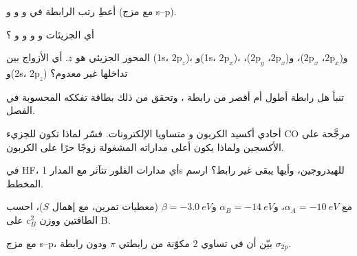 \begin{exercise}[$\star$]\label{exo:b2:diatomic-mos:2}
أعطِ رتب الرابطة في  و و و (مع مزج
s--p).
\end{exercise}

\begin{exercise}[$\star$]\label{exo:b2:diatomic-mos:3}
أي الجزيئات  و و و و ؟
\end{exercise}

\begin{exercise}[$\star$]\label{exo:b2:diatomic-mos:4}
المحور الجزيئي هو $z$. أي الأزواج بين (1s، $2\mathrm p_z$)، و(1s،
$2\mathrm p_x$)، و($2\mathrm p_x$، $2\mathrm p_x$)، و($2\mathrm p_x$، $2\mathrm p_y$)،
و(2s، $2\mathrm p_z$) تداخلها غير معدوم؟
\end{exercise}

\begin{exercise}[$\star\star$]\label{exo:b2:diatomic-mos:5}
تنبأ هل رابطة  أطول أم أقصر من رابطة ، وتحقق من ذلك بطاقة
تفككه المحسوبة في الفصل.
\end{exercise}

\begin{exercise}[$\star\star$]\label{exo:b2:diatomic-mos:6}
أحادي أكسيد الكربون و متساويا الإلكترونات. فسّر لماذا تكون 
للجزيء CO مرجَّحة على الأكسجين ولماذا يكون أعلى مداراته المشغولة زوجًا حرًا على
الكربون.
\end{exercise}

\begin{exercise}[$\star\star$]\label{exo:b2:diatomic-mos:7}
في HF، أي مدارات الفلور تتآثر مع المدار 1s للهيدروجين، وأيها يبقى
غير رابط؟ ارسم المخطط.
\end{exercise}

\begin{exercise}[$\star\star$]\label{exo:b2:diatomic-mos:8}
مع $\alpha_A = \qty{-10}{eV}$، و$\alpha_B = \qty{-14}{eV}$ و$\beta = \qty{-3.0}{eV}$
(معطيات تمرين، مع إهمال $S$)، احسب الطاقتين ووزن $c_B^2$
 على B.
\end{exercise}

\begin{exercise}[$\star\star$]\label{exo:b2:diatomic-mos:9}
مع مزج s--p، بيّن أن  في  تساوي 2 مكوّنة من رابطتي $\pi$ ودون
رابطة $\sigma_{2p}$.
\end{exercise}

